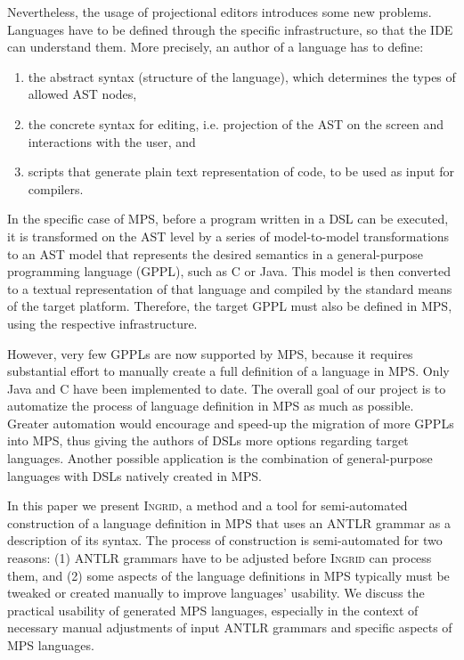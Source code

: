 Nevertheless, the usage of projectional editors introduces some new problems.
Languages have to be defined through the specific infrastructure, so that the IDE can understand them.
More precisely, an author of a language has to define:
\begin{enumerate}
	\item the abstract syntax (structure of the language), which determines the types of allowed AST nodes,
	\item the concrete syntax for editing, i.e. projection of the AST on the screen and interactions with the user, and
	\item scripts that generate plain text representation of code, to be used as input for compilers.
\end{enumerate}	

In the specific case of MPS, before a program written in a DSL can be executed, it is transformed on the AST level by a series of model-to-model transformations to an AST model that represents the desired semantics in a general-purpose programming language (GPPL), such as C or Java.
This model is then converted to a textual representation of that language and compiled by the standard means of the target platform.
Therefore, the target GPPL must also be defined in MPS, using the respective infrastructure.

However, very few GPPLs are now supported by MPS, because it requires substantial effort to manually create a full definition of a language in MPS.
Only Java and C have been implemented to date.
The overall goal of our project is to automatize the process of language definition in MPS as much as possible.
Greater automation would encourage and speed-up the migration of more GPPLs into MPS, thus giving the authors of DSLs more options regarding target languages.
Another possible application is the combination of general-purpose languages with DSLs natively created in MPS.

In this paper we present \textsc{Ingrid}, a method and a tool for semi-automated construction of a language definition in MPS that uses an ANTLR grammar as a description of its syntax.
The process of construction is semi-automated for two reasons: (1) ANTLR grammars have to be adjusted before \textsc{Ingrid} can process them, and (2) some aspects of the language definitions in MPS typically must be tweaked or created manually to improve languages' usability.
We discuss the practical usability of generated MPS languages, especially in the context of necessary manual adjustments of input ANTLR grammars and specific aspects of MPS languages.

